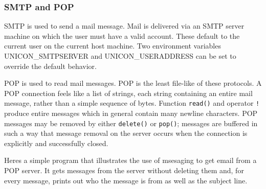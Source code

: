 \subsubsection{SMTP and POP}

SMTP is used to send a mail message. Mail is delivered via
an SMTP server machine on which the user must have a valid account.
These default to the current user on the current host machine. Two
environment variables UNICON\_SMTPSERVER and UNICON\_USERADDRESS can be
set to override the default behavior.

POP is used to read mail messages. POP is the least file-like
of these protocols. A POP connection feels like a list of strings, each
string containing an entire mail message, rather than a simple sequence
of bytes. Function \texttt{read()} and operator \texttt{!} produce
entire messages which in general contain many newline characters. POP
messages may be removed by either \texttt{delete()} or \texttt{pop()};
messages are buffered in such a way that message removal on the server
occurs when the connection is explicitly and successfully closed.

Here{\textquotesingle}s a simple program that illustrates the use of
msesaging to get email from a POP server. It gets messages from the
server without deleting them and, for every message, prints out who the
message is from as well as the subject line.


